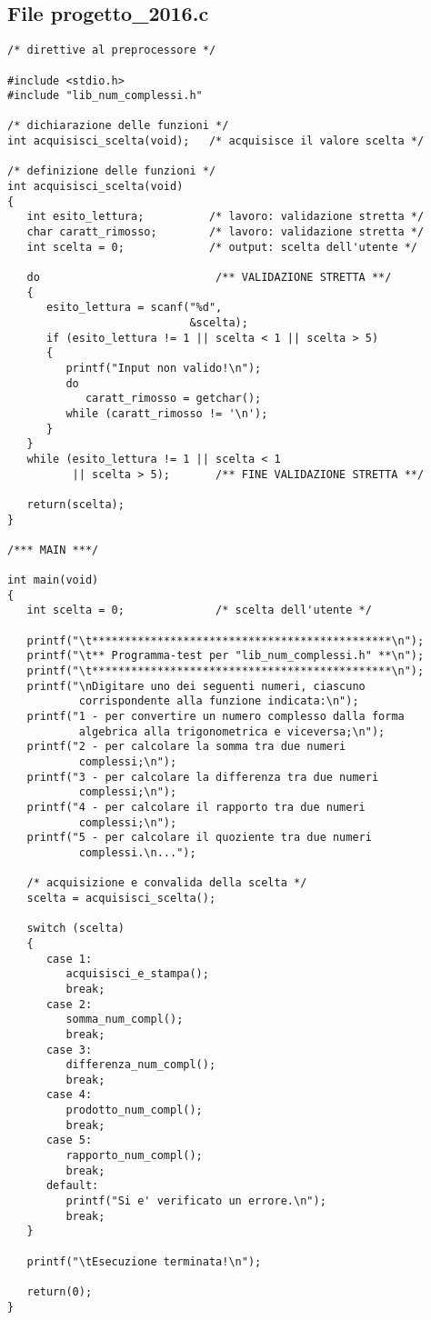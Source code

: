 \documentclass[a4paper,10pt]{article}
\begin{document}
\subsection*{File progetto\_2016.c}			%
\begin{verbatim}
/* direttive al preprocessore */

#include <stdio.h>
#include "lib_num_complessi.h"

/* dichiarazione delle funzioni */
int acquisisci_scelta(void);   /* acquisisce il valore scelta */

/* definizione delle funzioni */
int acquisisci_scelta(void)
{
   int esito_lettura;          /* lavoro: validazione stretta */
   char caratt_rimosso;        /* lavoro: validazione stretta */
   int scelta = 0;             /* output: scelta dell'utente */

   do                           /** VALIDAZIONE STRETTA **/
   {
      esito_lettura = scanf("%d",
                            &scelta);
      if (esito_lettura != 1 || scelta < 1 || scelta > 5)
      {
         printf("Input non valido!\n");
         do
            caratt_rimosso = getchar();
         while (caratt_rimosso != '\n');
      }
   }
   while (esito_lettura != 1 || scelta < 1
          || scelta > 5);       /** FINE VALIDAZIONE STRETTA **/

   return(scelta);
}

/*** MAIN ***/

int main(void)
{
   int scelta = 0;              /* scelta dell'utente */
	
   printf("\t**********************************************\n");
   printf("\t** Programma-test per "lib_num_complessi.h" **\n");
   printf("\t**********************************************\n");
   printf("\nDigitare uno dei seguenti numeri, ciascuno 
           corrispondente alla funzione indicata:\n");
   printf("1 - per convertire un numero complesso dalla forma
           algebrica alla trigonometrica e viceversa;\n");
   printf("2 - per calcolare la somma tra due numeri
           complessi;\n");
   printf("3 - per calcolare la differenza tra due numeri
           complessi;\n");
   printf("4 - per calcolare il rapporto tra due numeri
           complessi;\n");
   printf("5 - per calcolare il quoziente tra due numeri 
           complessi.\n...");

   /* acquisizione e convalida della scelta */
   scelta = acquisisci_scelta();

   switch (scelta)
   {
      case 1:
         acquisisci_e_stampa();
         break;
      case 2:
         somma_num_compl();
         break;
      case 3:
         differenza_num_compl();
         break;
      case 4:
         prodotto_num_compl();
         break;
      case 5:
         rapporto_num_compl();
         break;
      default:
         printf("Si e' verificato un errore.\n");
         break;
   }

   printf("\tEsecuzione terminata!\n");

   return(0);
}
\end{verbatim}						%
\end{document}
